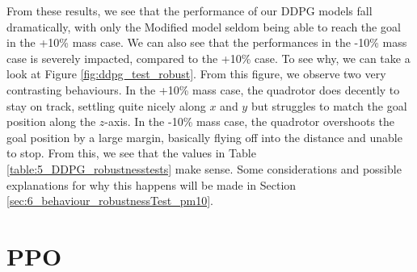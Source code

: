 From these results, we see that the performance of our DDPG models fall dramatically, with only the Modified model seldom being able to reach the goal in the +10\% mass case. We can also see that the performances in the -10\% mass case is severely impacted, compared to the +10\% case. To see why, we can take a look at Figure \ref{fig:ddpg_test_robust}.
From this figure, we observe two very contrasting behaviours. In the +10\% mass case, the quadrotor does decently to stay on track, settling quite nicely along $x$ and $y$ but struggles to match the goal position along the $z$-axis. In the -10\% mass case, the quadrotor overshoots the goal position by a large margin, basically flying off into the distance and unable to stop. From this, we see that the values in Table \ref{table:5_DDPG_robustnesstests} make sense.
Some considerations and possible explanations for why this happens will be made in Section \ref{sec:6_behaviour_robustnessTest_pm10}.


\section{PPO}
\label{sec:5_PPO}

